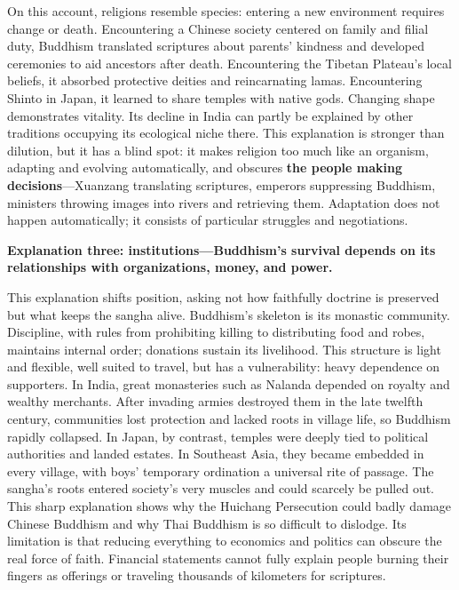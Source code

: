 On this account, religions resemble species: entering a new environment requires change or death. Encountering a Chinese society centered on family and filial duty, Buddhism translated scriptures about parents' kindness and developed ceremonies to aid ancestors after death. Encountering the Tibetan Plateau's local beliefs, it absorbed protective deities and reincarnating lamas. Encountering Shinto in Japan, it learned to share temples with native gods. Changing shape demonstrates vitality. Its decline in India can partly be explained by other traditions occupying its ecological niche there. This explanation is stronger than dilution, but it has a blind spot: it makes religion too much like an organism, adapting and evolving automatically, and obscures \textbf{the people making decisions}---Xuanzang translating scriptures, emperors suppressing Buddhism, ministers throwing images into rivers and retrieving them. Adaptation does not happen automatically; it consists of particular struggles and negotiations.

\textbf{Explanation three: institutions---Buddhism's survival depends on its relationships with organizations, money, and power.}

This explanation shifts position, asking not how faithfully doctrine is preserved but what keeps the sangha alive. Buddhism's skeleton is its monastic community. Discipline, with rules from prohibiting killing to distributing food and robes, maintains internal order; donations sustain its livelihood. This structure is light and flexible, well suited to travel, but has a vulnerability: heavy dependence on supporters. In India, great monasteries such as Nalanda depended on royalty and wealthy merchants. After invading armies destroyed them in the late twelfth century, communities lost protection and lacked roots in village life, so Buddhism rapidly collapsed. In Japan, by contrast, temples were deeply tied to political authorities and landed estates. In Southeast Asia, they became embedded in every village, with boys' temporary ordination a universal rite of passage. The sangha's roots entered society's very muscles and could scarcely be pulled out. This sharp explanation shows why the Huichang Persecution could badly damage Chinese Buddhism and why Thai Buddhism is so difficult to dislodge. Its limitation is that reducing everything to economics and politics can obscure the real force of faith. Financial statements cannot fully explain people burning their fingers as offerings or traveling thousands of kilometers for scriptures.

